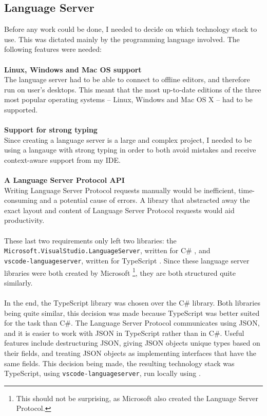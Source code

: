 \documentclass[../main.tex]{subfiles}
\begin{document}
\subsection{Language Server}
Before any work could be done, I needed to decide on which technology stack to use. This was dictated mainly by the programming language involved. The following features were needed:
\\
\\
\textbf{Linux, Windows and Mac OS support} \\
The language server had to be able to connect to offline editors, and therefore run on user's desktops. This meant that the most up-to-date editions of the three most popular operating systems -- Linux, Windows and Mac OS X -- had to be supported.
\\
\\
\textbf{Support for strong typing} \\
Since creating a language server is a large and complex project, I needed to be using a langauge with strong typing in order to both avoid mistakes and receive context-aware support from my IDE.
\\
\\
\textbf{A Language Server Protocol API} \\
Writing Language Server Protocol requests manually would be inefficient, time-consuming and a potential cause of errors. A library that abstracted away the exact layout and content of Language Server Protocol requests would aid productivity.
\\ 
\\
These last two requirements only left two libraries: the \\ 
\texttt{Microsoft.VisualStudio.LanguageServer}, written for C\# \cite{visual_studio_language_server}, and \\ 
\texttt{vscode-languageserver}, written for TypeScript \cite{vsc_langserver_docs}. Since these language server libraries were both created by Microsoft \footnote{This should not be surprising, as Microsoft also created the Language Server Protocol.}, they are both structured quite similarly. 
\\
\\
In the end, the TypeScript library was chosen over the C\# library. Both libraries being quite similar, this decision was made because TypeScript was better suited for the task than C\#. The Language Server Protocol communicates using JSON, and it is easier to work with JSON in TypeScript rather than in C\#. Useful features include destructuring JSON, giving JSON objects unique types based on their fields, and treating JSON objects as implementing interfaces that have the same fields. This decision being made, the resulting technology stack was TypeScript, using \texttt{vscode-languageserver}, run locally using . 
\end{document}
